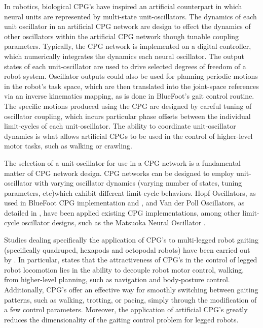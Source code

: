 		In robotics, biological CPG's have inspired an artificial counterpart in which neural units are represented by multi-state unit-oscillators. The dynamics of each unit oscillator in an artificial CPG network are design to effect the dynamics of other oscillators within the artificial CPG network though tunable coupling parameters. Typically, the CPG network is implemented on a digital controller, which numerically integrates the dynamics each neural oscillator. The output states of each unit-oscillator are used to drive selected degrees of freedom of a robot system. Oscillator outputs could also be used for planning periodic motions in the robot's task space, which are then translated into the joint-space references via an inverse kinematics mapping, as is done in BlueFoot's gait control routine. The specific motions produced using the CPG are designed by careful tuning of oscillator coupling, which incurs particular phase offsets between the individual limit-cycles of each unit-oscillator. The ability to coordinate unit-oscillator dynamics is what allows artificial CPGs to be used in the control of higher-level motor tasks, such as walking or crawling.

		The selection of a unit-oscillator for use in a CPG network is a fundamental matter of CPG network design. CPG networks can be designed to employ unit-oscillator with varying oscillator dynamics (\IE varying number of states, tuning parameters, etc)which exhibit different limit-cycle behaviors. Hopf Oscillators, as used in BlueFoot CPG implementation and \cite{Righetti2006,Rutishauser2008,Matos2010}, and Van der Poll Oscillators, as detailed in \cite{Ijspeert2008}, have been applied existing CPG implementations, among other limit-cycle oscillator designs, such as the Matsuoka Neural Oscillator \cite{Endo2004}.

		Studies dealing specifically the application of CPG's to multi-legged robot gaiting (specifically quadruped, hexapods and octopodal robots) have been carried out by \cite{Arena2001,Klaassen2002,Arena2004,Inagaki2003,Inagaki2006,Billard2000,Brambilla2006,Buchli2006,Tsujita2001,Tsujita2004}.  In particular, \cite{Ijspeert2008} states that the attractiveness of CPG's in the control of legged robot locomotion lies in the ability to decouple robot motor control, \IE walking, from higher-level planning, such as navigation and body-posture control. Additionally, CPG's offer an effective way for smoothly switching between gaiting patterns, such as walking, trotting, or pacing, simply through the modification of a few control parameters. Moreover, the application of artificial CPG's greatly reduces the dimensionality of the gaiting control problem for legged robots. 

